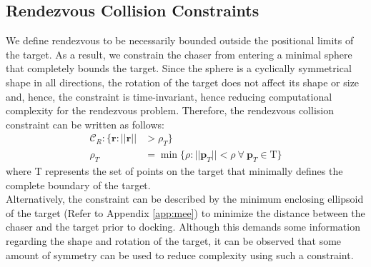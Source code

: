 \subsection{Rendezvous Collision Constraints}
\label{sec:rendezvous-collision-constraints}
We define rendezvous to be necessarily bounded outside the positional limits of the target.
As a result, we constrain the chaser from entering a minimal sphere that completely bounds the target.
Since the sphere is a cyclically symmetrical shape in all directions, the rotation of the target does not affect its shape or size and, hence, the constraint is time-invariant, hence reducing computational complexity for the rendezvous problem.
Therefore, the rendezvous collision constraint can be written as follows:
\begin{align}
    {\mathcal{C}}_R:\{\boldsymbol{r}:||\boldsymbol{r}||&>\rho_T\}\\
    \rho_T&=\min\{\rho:||\boldsymbol{p}_T||<\rho\ \forall\ \boldsymbol{p}_T\in\text{T}\}
\end{align}
where T represents the set of points on the target that minimally defines the complete boundary of the target.\\
Alternatively, the constraint can be described by the minimum enclosing ellipsoid of the target (Refer to Appendix \ref{app:mee}) to minimize the distance between the chaser and the target prior to docking.
Although this demands some information regarding the shape and rotation of the target, it can be observed that some amount of symmetry can be used to reduce complexity using such a constraint.
